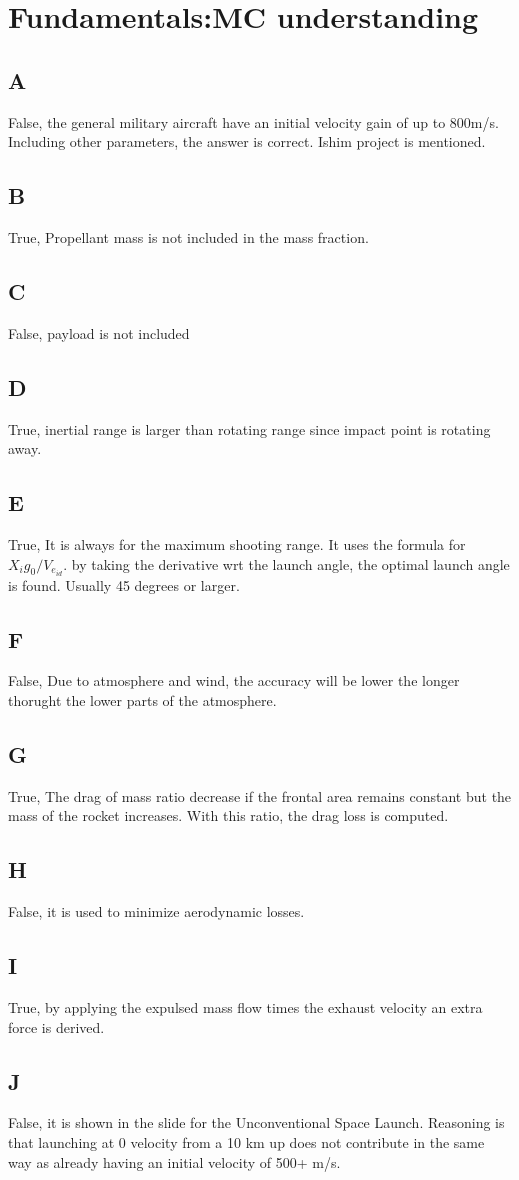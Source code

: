 \section{ Fundamentals:MC understanding }\label{sec:q1}    
\subsection*{A}
False, the general military aircraft have an initial velocity gain of up to 800m/s. Including other parameters, the answer is correct. Ishim project is mentioned.
\subsection*{B}
True, Propellant mass is not included in the mass fraction.
\subsection*{C}
False, payload is not included
\subsection*{D}
True, inertial range is larger than rotating range since impact point is rotating away.
\subsection*{E}
True, It is always for the maximum shooting range. It uses the formula for $X_ig_0/V_{e_{id}}$. by taking the derivative wrt the launch angle, the optimal launch angle is found. Usually 45 degrees or larger.
\subsection*{F}
False, Due to atmosphere and wind, the accuracy will be lower the longer thorught the lower parts of the atmosphere.
\subsection*{G}
True, The drag of mass ratio decrease if the frontal area remains constant but the mass of the rocket increases. With this ratio, the drag loss is computed.
\subsection*{H}
False, it is used to minimize aerodynamic losses.
\subsection*{I}
True, by applying the expulsed mass flow times the exhaust velocity an extra force is derived.
\subsection*{J}
False, it is shown in the slide for the Unconventional Space Launch. Reasoning is that launching at 0 velocity from a 10 km up does not contribute in the same way as already having an initial velocity of 500+ m/s.